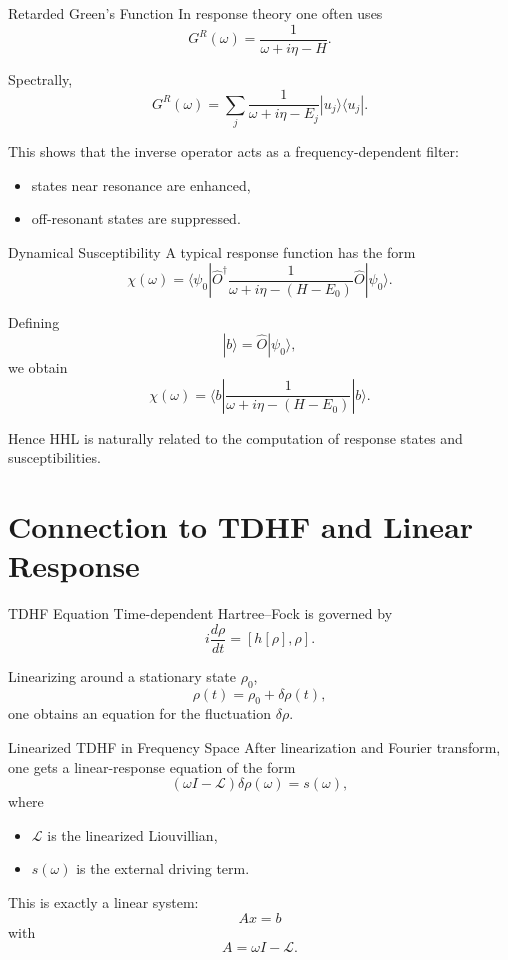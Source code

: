 \documentclass{beamer}
\begin{document}

\begin{frame}{Retarded Green's Function}
In response theory one often uses
\[
G^R(\omega) = \frac{1}{\omega + i\eta - H}.
\]

Spectrally,
\[
G^R(\omega)
=
\sum_j
\frac{1}{\omega + i\eta - E_j}
|u_j\rangle\langle u_j|.
\]

This shows that the inverse operator acts as a frequency-dependent filter:
\begin{itemize}
\item states near resonance are enhanced,
\item off-resonant states are suppressed.
\end{itemize}
\end{frame}


\begin{frame}{Dynamical Susceptibility}
A typical response function has the form
\[
\chi(\omega)
=
\langle \psi_0 |
\hat{O}^\dagger
\frac{1}{\omega + i\eta - (H-E_0)}
\hat{O}
|\psi_0\rangle.
\]

Defining
\[
|b\rangle = \hat{O}|\psi_0\rangle,
\]
we obtain
\[
\chi(\omega)
=
\langle b|
\frac{1}{\omega + i\eta - (H-E_0)}
|b\rangle.
\]

Hence HHL is naturally related to the computation of response states and susceptibilities.
\end{frame}

\section{Connection to TDHF and Linear Response}

\begin{frame}{TDHF Equation}
Time-dependent Hartree--Fock is governed by
\[
i \frac{d\rho}{dt} = [h[\rho],\rho].
\]

Linearizing around a stationary state \(\rho_0\),
\[
\rho(t) = \rho_0 + \delta\rho(t),
\]
one obtains an equation for the fluctuation \(\delta \rho\).
\end{frame}


\begin{frame}{Linearized TDHF in Frequency Space}
After linearization and Fourier transform, one gets a linear-response equation of the form
\[
(\omega I - \mathcal{L}) \delta \rho(\omega) = s(\omega),
\]
where
\begin{itemize}
\item \(\mathcal{L}\) is the linearized Liouvillian,
\item \(s(\omega)\) is the external driving term.
\end{itemize}

This is exactly a linear system:
\[
A x = b
\]
with
\[
A = \omega I - \mathcal{L}.
\]
\end{frame}
\end{document}
